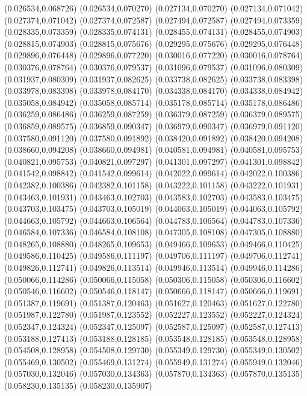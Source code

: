 (0.026534,0.068726)
(0.026534,0.070270)
(0.027134,0.070270)
(0.027134,0.071042)
(0.027374,0.071042)
(0.027374,0.072587)
(0.027494,0.072587)
(0.027494,0.073359)
(0.028335,0.073359)
(0.028335,0.074131)
(0.028455,0.074131)
(0.028455,0.074903)
(0.028815,0.074903)
(0.028815,0.075676)
(0.029295,0.075676)
(0.029295,0.076448)
(0.029896,0.076448)
(0.029896,0.077220)
(0.030016,0.077220)
(0.030016,0.078764)
(0.030376,0.078764)
(0.030376,0.079537)
(0.031096,0.079537)
(0.031096,0.080309)
(0.031937,0.080309)
(0.031937,0.082625)
(0.033738,0.082625)
(0.033738,0.083398)
(0.033978,0.083398)
(0.033978,0.084170)
(0.034338,0.084170)
(0.034338,0.084942)
(0.035058,0.084942)
(0.035058,0.085714)
(0.035178,0.085714)
(0.035178,0.086486)
(0.036259,0.086486)
(0.036259,0.087259)
(0.036379,0.087259)
(0.036379,0.089575)
(0.036859,0.089575)
(0.036859,0.090347)
(0.036979,0.090347)
(0.036979,0.091120)
(0.037580,0.091120)
(0.037580,0.091892)
(0.038420,0.091892)
(0.038420,0.094208)
(0.038660,0.094208)
(0.038660,0.094981)
(0.040581,0.094981)
(0.040581,0.095753)
(0.040821,0.095753)
(0.040821,0.097297)
(0.041301,0.097297)
(0.041301,0.098842)
(0.041542,0.098842)
(0.041542,0.099614)
(0.042022,0.099614)
(0.042022,0.100386)
(0.042382,0.100386)
(0.042382,0.101158)
(0.043222,0.101158)
(0.043222,0.101931)
(0.043463,0.101931)
(0.043463,0.102703)
(0.043583,0.102703)
(0.043583,0.103475)
(0.043703,0.103475)
(0.043703,0.105019)
(0.044063,0.105019)
(0.044063,0.105792)
(0.044663,0.105792)
(0.044663,0.106564)
(0.044783,0.106564)
(0.044783,0.107336)
(0.046584,0.107336)
(0.046584,0.108108)
(0.047305,0.108108)
(0.047305,0.108880)
(0.048265,0.108880)
(0.048265,0.109653)
(0.049466,0.109653)
(0.049466,0.110425)
(0.049586,0.110425)
(0.049586,0.111197)
(0.049706,0.111197)
(0.049706,0.112741)
(0.049826,0.112741)
(0.049826,0.113514)
(0.049946,0.113514)
(0.049946,0.114286)
(0.050066,0.114286)
(0.050066,0.115058)
(0.050306,0.115058)
(0.050306,0.116602)
(0.050546,0.116602)
(0.050546,0.118147)
(0.050666,0.118147)
(0.050666,0.119691)
(0.051387,0.119691)
(0.051387,0.120463)
(0.051627,0.120463)
(0.051627,0.122780)
(0.051987,0.122780)
(0.051987,0.123552)
(0.052227,0.123552)
(0.052227,0.124324)
(0.052347,0.124324)
(0.052347,0.125097)
(0.052587,0.125097)
(0.052587,0.127413)
(0.053188,0.127413)
(0.053188,0.128185)
(0.053548,0.128185)
(0.053548,0.128958)
(0.054508,0.128958)
(0.054508,0.129730)
(0.055349,0.129730)
(0.055349,0.130502)
(0.055469,0.130502)
(0.055469,0.131274)
(0.055949,0.131274)
(0.055949,0.132046)
(0.057030,0.132046)
(0.057030,0.134363)
(0.057870,0.134363)
(0.057870,0.135135)
(0.058230,0.135135)
(0.058230,0.135907)
